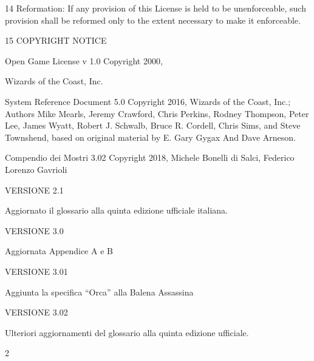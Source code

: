 \begin{multicols}{2}
14 Reformation: If any provision of this License is held to be
unenforceable, such provision shall be reformed only to the extent
necessary to make it enforceable.

15 COPYRIGHT NOTICE

Open Game License v 1.0 Copyright 2000,

Wizards of the Coast, Inc.

System Reference Document 5.0 Copyright 2016, Wizards of the Coast,
Inc.; Authors Mike Mearls, Jeremy Crawford, Chris Perkins, Rodney
Thompson, Peter Lee, James Wyatt, Robert J. Schwalb, Bruce R. Cordell,
Chris Sims, and Steve Townshend, based on original material by E. Gary
Gygax And Dave Arneson.

Compendio dei Mostri 3.02 Copyright 2018, Michele Bonelli di Salci,
Federico Lorenzo Gavrioli

VERSIONE 2.1

Aggiornato il glossario alla quinta edizione ufficiale italiana.

VERSIONE 3.0

Aggiornata Appendice A e B

VERSIONE 3.01

Aggiunta la specifica ``Orca'' alla Balena Assassina

VERSIONE 3.02

Ulteriori aggiornamenti del glossario alla quinta edizione ufficiale.

\end{multicols}{2}
